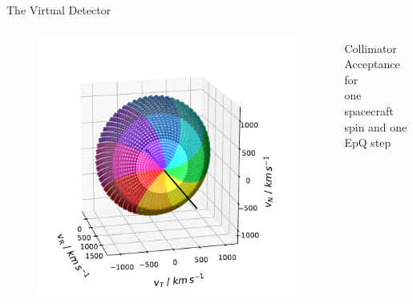 \documentclass{beamer}
\begin{document}
\begin{frame}{The Virtual Detector}
\begin{columns}
		\column[]{6.5cm}
				\begin{figure}
			\includegraphics[scale=0.38]{Pics/col_vspace_normal.pdf}
		\end{figure}
		\begin{center}
			{\scriptsize Collimator Acceptance for \\one spacecraft spin and one EpQ step}
		\end{center}
	\end{columns}
	
\end{frame}

\end{document}
